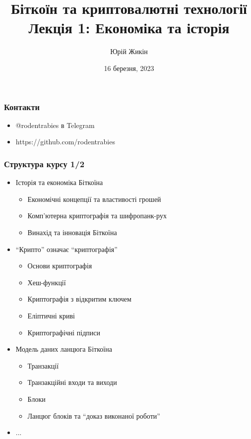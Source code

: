 \documentclass{beamer}
\title{
  Біткоїн та криптовалютні технології \\
  Лекція 1: Економіка та історія
}
\author{Юрій Жикін}
\date{16 березня, 2023}
\begin{document}
\frame{\titlepage}

\begin{frame}
  \frametitle{Контакти}
  \begin{itemize}
  \item @rodentrabies в Telegram
  \item https://github.com/rodentrabies
  \end{itemize}
\end{frame}

\begin{frame}
  \frametitle{Структура курсу 1/2}
  \begin{itemize}
  \item Історія та економіка Біткоїна
    \begin{itemize}
    \item Економічні концепції та властивості грошей
    \item Комп'ютерна криптографія та шифропанк-рух
    \item Винахід та інновація Біткоїна
    \end{itemize}
  \item ``Крипто'' означає ``криптографія''
    \begin{itemize}
    \item Основи криптографія
    \item Хеш-функції
    \item Криптографія з відкритим ключем
    \item Еліптичні криві
    \item Криптографічні підписи
    \end{itemize}
  \item Модель даних ланцюга Біткоїна
    \begin{itemize}
    \item Транзакції
    \item Транзакційні входи та виходи
    \item Блоки
    \item Ланцюг блоків та ``доказ виконаної роботи''
    \end{itemize}
  \item[] ...
  \end{itemize}
\end{frame}
\end{document}
